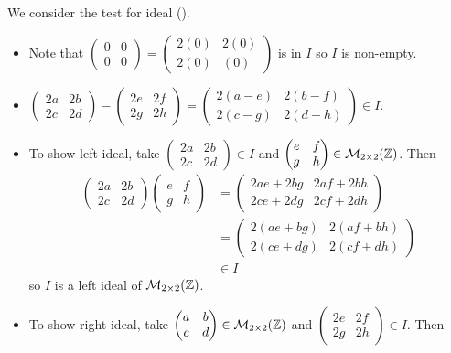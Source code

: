 \begin{questions}
    \item We consider the test for ideal ().
    \begin{itemize}
        \item Note that $\begin{pmatrix}0&0\\0&0\end{pmatrix}=\begin{pmatrix}2(0)&2(0)\\2(0)&(0)\end{pmatrix}$ is in $I$ so $I$ is non-empty.
        \item $\begin{pmatrix}2a&2b\\2c&2d\end{pmatrix}-\begin{pmatrix}2e&2f\\2g&2h\end{pmatrix} = \begin{pmatrix}2(a-e)&2(b-f)\\2(c-g)&2(d-h)\end{pmatrix} \in I$.
        \item To show left ideal, take $\begin{pmatrix}2a&2b\\2c&2d\end{pmatrix} \in I$ and $\begin{pmatrix}e&f\\g&h\end{pmatrix} \in \mathcal{M}_{2\times2}(\mathbb{Z})$. Then
        \begin{align*}
            \begin{pmatrix}2a&2b\\2c&2d\end{pmatrix}\begin{pmatrix}e&f\\g&h\end{pmatrix} &= \begin{pmatrix}2ae+2bg&2af+2bh\\2ce+2dg&2cf+2dh\end{pmatrix}\\
            &= \begin{pmatrix}2(ae+bg)&2(af+bh)\\2(ce+dg)&2(cf+dh)\end{pmatrix}\\
            &\in I
        \end{align*}
        so $I$ is a left ideal of $\mathcal{M}_{2\times2}(\mathbb{Z})$.
        \item To show right ideal, take $\begin{pmatrix}a&b\\c&d\end{pmatrix} \in \mathcal{M}_{2\times2}(\mathbb{Z})$ and $\begin{pmatrix}2e&2f\\2g&2h\end{pmatrix} \in I$. Then

\end{itemize}
\end{questions}
